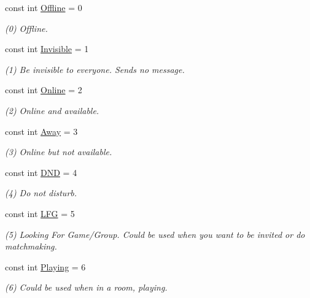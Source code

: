 \begin{DoxyCompactItemize}
\item 
const int \hyperlink{class_exit_games_1_1_client_1_1_photon_1_1_chat_1_1_chat_user_status_a3ad23f7750af493dc34e7bb84fa6edcd}{Offline} = 0
\begin{DoxyCompactList}\small\item\em (0) Offline.\end{DoxyCompactList}\item 
const int \hyperlink{class_exit_games_1_1_client_1_1_photon_1_1_chat_1_1_chat_user_status_a5d307822db6e769821d9dc86477171e2}{Invisible} = 1
\begin{DoxyCompactList}\small\item\em (1) Be invisible to everyone. Sends no message.\end{DoxyCompactList}\item 
const int \hyperlink{class_exit_games_1_1_client_1_1_photon_1_1_chat_1_1_chat_user_status_af9f7b1d3f7cb4f6acb966679e7080ac2}{Online} = 2
\begin{DoxyCompactList}\small\item\em (2) Online and available.\end{DoxyCompactList}\item 
const int \hyperlink{class_exit_games_1_1_client_1_1_photon_1_1_chat_1_1_chat_user_status_ac0d131911c02002db06c39f7bd03d3b7}{Away} = 3
\begin{DoxyCompactList}\small\item\em (3) Online but not available.\end{DoxyCompactList}\item 
const int \hyperlink{class_exit_games_1_1_client_1_1_photon_1_1_chat_1_1_chat_user_status_a428da57bdeeb644c8fbeb3b1f5fb53b5}{D\+ND} = 4
\begin{DoxyCompactList}\small\item\em (4) Do not disturb.\end{DoxyCompactList}\item 
const int \hyperlink{class_exit_games_1_1_client_1_1_photon_1_1_chat_1_1_chat_user_status_af729b56f77e02acbe8d1f079ace322a3}{L\+FG} = 5
\begin{DoxyCompactList}\small\item\em (5) Looking For Game/\+Group. Could be used when you want to be invited or do matchmaking.\end{DoxyCompactList}\item 
const int \hyperlink{class_exit_games_1_1_client_1_1_photon_1_1_chat_1_1_chat_user_status_a6db26d8e73bd24a01a9239caab6c6112}{Playing} = 6
\begin{DoxyCompactList}\small\item\em (6) Could be used when in a room, playing.\end{DoxyCompactList}\end{DoxyCompactItemize}


